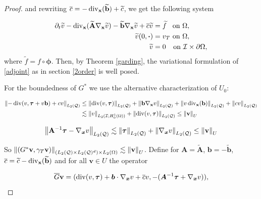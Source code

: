 \begin{proof}
    and rewriting $\overline{c}=-\operatorname{div}_{\mathbf{x}}(\widetilde{\mathbf{b}})+\widetilde{c}$, we get the following system
    
    \begin{subequations}\label{adjoint}
        \begin{align}
            \partial_t\widetilde{v}-\operatorname{div}_{\mathbf{x}}(\widetilde{\mathbf{A}}\nabla_{\mathbf{x}}\widetilde{v})-\widetilde{\mathbf{b}}\nabla_{\mathbf{x}}\widetilde{v}+\overline{c}\widetilde{v}&=\widetilde{f} \hspace{0.18 cm}\text{ on }\Omega,\\
            \widetilde{v}(0,\boldsymbol{\cdot})&=v_T \text{ on }\Omega,\\\widetilde{v}&=0 \hspace{0.25 cm}\text{ on }\mathcal{I}\times\partial\Omega,
        \end{align}
    \end{subequations}
where $\widetilde{f}=f\circ\boldsymbol{\phi}$. Then, by Theorem \ref{garding}, the variational formulation of \eqref{adjoint} as in section \ref{2order} is well posed.

For the boundedness of $G^*$  we use the alternative characterization of $U_0$:

\begin{align*}
    \left\lVert-\operatorname{div}(v,\boldsymbol{\tau}+v\mathbf{b})+cv \right\rVert_{L_2(\mathcal{Q})}&\leq \left\lVert\operatorname{div}(v,\boldsymbol{\tau}) \right\rVert_{L_2(\mathcal{Q})}+\left\lVert\mathbf{b}\nabla_{\mathbf{x}}v \right\rVert_{L_2(\mathcal{Q})}+\left\lVert v\operatorname{div}_{\mathbf{x}}(\mathbf{b}) \right\rVert_{L_2(\mathcal{Q})}+\left\lVert cv \right\rVert_{L_2(\mathcal{Q})}\\&\lesssim \left\lVert v \right\rVert_{L_2(\mathcal{I};H_0^1(\Omega))}+\left\lVert\operatorname{div}(v,\boldsymbol{\tau}) \right\rVert_{L_2(\mathcal{Q})}\leq \left\lVert\mathbf{v} \right\rVert_{U}
\end{align*}

\begin{align*}
    \left\lVert\mathbf{A}^{-1}\boldsymbol{\tau}-\nabla_{\boldsymbol{x}} v \right\rVert_{L_2(\mathcal{Q})}\lesssim \left\lVert\boldsymbol{\tau} \right\rVert_{L_2(\mathcal{Q})}+\left\lVert\nabla_{\boldsymbol{x}} v \right\rVert_{L_2(\mathcal{Q})}\leq\left\lVert\mathbf{v} \right\rVert_{U}
\end{align*}

So $\left\lVert(G^*\mathbf{v},\gamma_T\mathbf{v}) \right\rVert_{(L_2(\mathcal{Q})\times L_2(\mathcal{Q})^d)\times L_2(\Omega)}\lesssim \left\lVert\mathbf{v} \right\rVert_{U}$. Define for $\boldsymbol{A}=\widetilde{\mathbf{A}}$, $\boldsymbol{b}=-\widetilde{\mathbf{b}}$, $\overline{c}=\widetilde{c}-\operatorname{div}_{\mathbf{x}}(\widetilde{\mathbf{b}})$ and for all $\mathbf{v}\in U$ the operator

    $$\overline{G}\mathbf{v}=(\operatorname{div}(v,\boldsymbol{\tau})+\boldsymbol{b}\cdot\nabla_{\boldsymbol{x}} v+\overline{c}v,-(\boldsymbol{A}^{-1}\boldsymbol{\tau}+\nabla_{\boldsymbol{x}} v)),$$


\end{proof}
